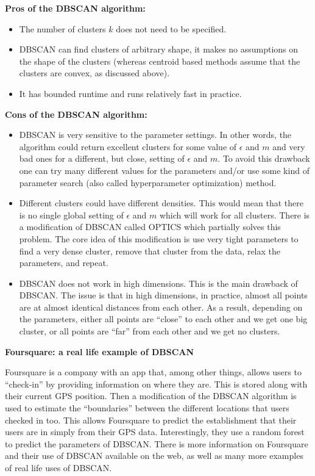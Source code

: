   \noindent\textbf{Pros of the DBSCAN algorithm:}  
  \begin{itemize}
    \item The number of clusters $k$ does not need to be specified.
    \item DBSCAN can find clusters of arbitrary shape, it makes no assumptions on the shape of the clusters (whereas centroid based methods assume that the clusters are convex, as discussed above).
    \item It has bounded runtime and runs relatively fast in practice.
  \end{itemize}
  
  \noindent\textbf{Cons of the DBSCAN algorithm:}  
  \begin{itemize}
    \item DBSCAN is very sensitive to the parameter settings. In other words, the algorithm could return excellent clusters for some value of $\epsilon$ and $m$
    and very bad ones for a different, but close, setting of $\epsilon$ and $m$. To avoid this drawback one can try many different values for the parameters and/or use
    some kind of parameter search (also called hyperparameter optimization) method.
    \item Different clusters could have different densities. This would mean that there is no single global setting of $\epsilon$ and $m$ which will work for all clusters.
    There is a modification of DBSCAN called OPTICS which partially solves this problem. The core idea of this modification is use very tight parameters to find a very
    dense cluster, remove that cluster from the data, relax the parameters, and repeat.
    \item DBSCAN does not work in high dimensions. This is the main drawback of DBSCAN. The issue is that in high dimensions, in practice, almost all points are
    at almost identical distances from each other. As a result, depending on the parameters, either all points are ``close'' to each other and we get one big
    cluster, or all points are ``far'' from each other and we get no clusters.
  \end{itemize}

  \noindent\textbf{Foursquare: a real life example of DBSCAN}  
  
  Foursquare is a company with an app that, among other things, allows users to ``check-in'' by providing information on where they are. This is stored along with their current GPS position.
  Then a modification of the DBSCAN algorithm is used to estimate the ``boundaries'' between the different locations that users checked in too. This allows Foursquare to predict the establishment that
  their users are in simply from their GPS data. Interestingly, they use a random forest to predict the parameters of DBSCAN. There is more information on Foursquare and their use of
  DBSCAN available on the web, as well as many more examples of real life uses of DBSCAN.
